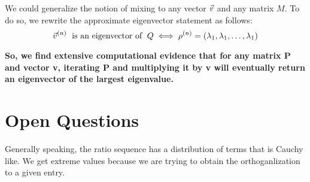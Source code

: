 We could generalize the notion of mixing to any vector $\vec{v}$ and any matrix $M$.
To do so, we rewrite the approximate eigenvector statement as follows:
$$\vec{v}^{(n)} \text{\; is an eigenvector of \;} Q \iff {\rho}^{(n)} = (\lambda_1, \lambda_1, \dots, \lambda_1)$$

\textbf{So, we find extensive computational evidence that for any matrix P and vector v, iterating P and multiplying it by v will eventually return an eigenvector of the largest eigenvalue.}

\newpage

\section{Open Questions}

Generally speaking, the ratio sequence has a distribution of terms that is Cauchy like. We get extreme values because we are trying to obtain the orthoganlization to a given entry.
